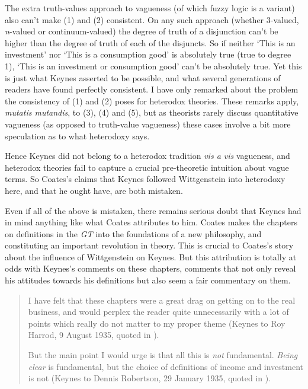 The extra truth-values approach to vagueness (of which fuzzy logic is a variant) also can't make (1) and (2) consistent. On any such approach (whether 3-valued, \textit{n}{}-valued or continuum-valued) the degree of truth of a disjunction can't be higher than the degree of truth of each of the disjuncts. So if neither `This is an investment' nor `This is a consumption good' is absolutely true (true to degree 1), `This is an investment or consumption good' can't be absolutely true. Yet this is just what Keynes asserted to be possible, and what several generations of readers have found perfectly consistent. I have only remarked about the problem the consistency of (1) and (2) poses for heterodox theories. These remarks apply, \textit{mutatis mutandis}, to (3), (4) and (5), but as theorists rarely discuss quantitative vagueness (as opposed to truth-value vagueness) these cases involve a bit more speculation as to what heterodoxy says.

Hence Keynes did not belong to a heterodox tradition \textit{vis a vis} vagueness, and heterodox theories fail to capture a crucial pre-theoretic intuition about vague terms. So Coates's claims that Keynes followed Wittgenstein into heterodoxy here, and that he ought have, are both mistaken.

Even if all of the above is mistaken, there remains serious doubt that Keynes had in mind anything like what Coates attributes to him. Coates makes the chapters on definitions in the \textit{GT} into the foundations of a new philosophy, and constituting an important revolution in theory. This is crucial to Coates's story about the influence of Wittgenstein on Keynes. But this attribution is totally at odds with Keynes's comments on these chapters, comments that not only reveal his attitudes towards his definitions but also seem a fair commentary on them.

\begin{quote}
I have felt that these chapters were a great drag on getting on to the real business, and would perplex the reader quite unnecessarily with a lot of points which really do not matter to my proper theme (Keynes to Roy Harrod, 9 August 1935, quoted in \cite[XIII: 537]{KeynesCW}).

But the main point I would urge is that all this is \textit{not} fundamental. \textit{Being clear} is fundamental, but the choice of definitions of income and investment is not (Keynes to Dennis Robertson, 29 January 1935, quoted in \cite[XIII, 495, italics in original]{KeynesCW}).
\end{quote}

